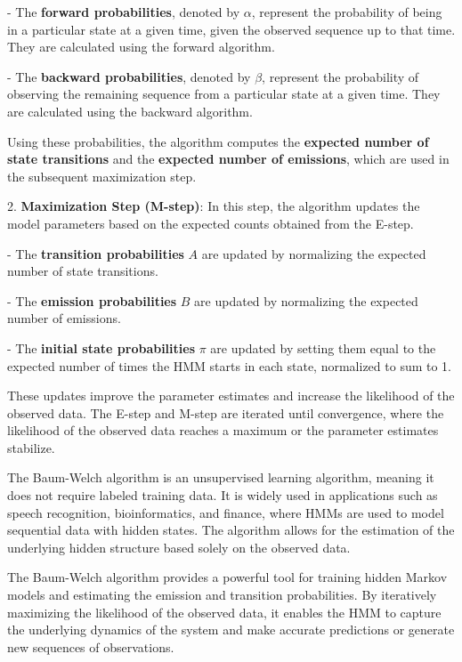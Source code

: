 \documentclass[a4paper,11pt]{article}
\begin{document}
   - The \textbf{forward probabilities}, denoted by $\alpha$, represent the probability of being in a particular 
   state at a given time, given the observed sequence up to that time. They are calculated using the forward 
   algorithm.

   - The \textbf{backward probabilities}, denoted by $\beta$, represent the probability of observing the 
   remaining sequence from a particular state at a given time. They are calculated using the backward 
   algorithm.

   Using these probabilities, the algorithm computes the \textbf{expected number of state transitions} and the 
   \textbf{expected number of emissions}, which are used in the subsequent maximization step.

2. \textbf{Maximization Step (M-step)}: In this step, the algorithm updates the model parameters based on the expected counts obtained from the E-step.

   - The \textbf{transition probabilities} $A$ are updated by normalizing the expected number of state transitions.

   - The \textbf{emission probabilities} $B$ are updated by normalizing the expected number of emissions.

   - The \textbf{initial state probabilities} $\pi$ are updated by setting them equal to the expected number of times the HMM starts in each state, normalized to sum to 1.

   These updates improve the parameter estimates and increase the likelihood of the observed data. The E-step and M-step are iterated until convergence, where the likelihood of the observed data reaches a maximum or the parameter estimates stabilize.

The Baum-Welch algorithm is an unsupervised learning algorithm, meaning it does not require labeled training data. It is widely used in applications such as speech recognition, bioinformatics, and finance, where HMMs are used to model sequential data with hidden states. The algorithm allows for the estimation of the underlying hidden structure based solely on the observed data.

The Baum-Welch algorithm provides a powerful tool for training hidden Markov models and estimating the emission and transition probabilities. By iteratively maximizing the likelihood of the observed data, it enables the HMM to capture the underlying dynamics of the system and make accurate predictions or generate new sequences of observations.
\end{document}
